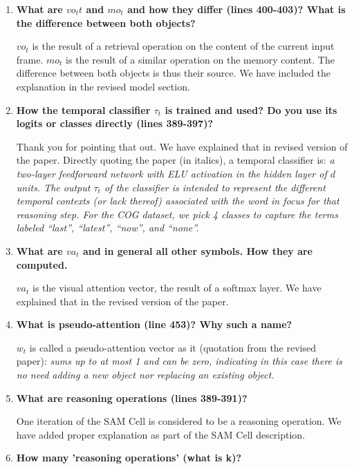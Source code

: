 \documentclass[10pt,twocolumn,letterpaper]{article}
\begin{document}
\begin{enumerate}
  \item \textbf{What are $vo_tt$ and $mo_t$ and how they differ (lines 400-403)? What is the difference between both objects?}
  
  $vo_t$ is the result of a retrieval operation on the content of the current input frame. $mo_t$ is the result of a similar operation on the memory content. The difference between both objects is thus their source. We have included the explanation in the revised model section.

  \item \textbf{How the temporal classifier $\tau_t$ is trained and used? Do you use its logits or classes directly (lines 389-397)?}
  
Thank you for pointing that out. We have explained that in revised version of the paper. Directly  quoting the paper (in italics), a temporal classifier is: \textit{a two-layer feedforward network with ELU activation in the hidden layer of $d$ units. The output $\tau_t$ of the classifier is intended to represent the different temporal contexts (or lack thereof) associated with the word in focus for that reasoning step. For the COG dataset, we pick 4 classes to capture the terms labeled “last”, “latest”, “now”, and “none”.}
  
  \item \textbf{What are $va_t$ and in general all other symbols. How they are computed.}
  
  $va_t$ is the visual attention vector, the result of a softmax layer. We have explained that in the revised version of the paper. 
  
  \item \textbf{What is pseudo-attention (line 453)? Why such a name?}
  
  $w_t$ is called a pseudo-attention vector as it (quotation from the revised paper): \textit{sums up to at most 1 and can be zero, indicating in this case there is no need adding a new object nor replacing an existing object.}
  
  \item \textbf{What are reasoning operations (lines 389-391)?}
  
  One iteration of the SAM Cell is considered to be a reasoning operation. We have added proper explanation as part of the SAM Cell description.
  
  \item \textbf{How many 'reasoning operations' (what is k)?}
  

\end{enumerate}
\end{document}
